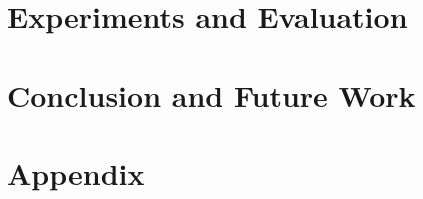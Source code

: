 \documentclass[fleqn]{report}
\begin{document}
\chapter{Experiments and Evaluation}
    \label{evaluation}
    
\newpage



\chapter{Conclusion and Future Work}
    \label{conclusion}
    
\newpage

\appendix
\chapter{Appendix}

\newpage


\newpage




\end{document}
